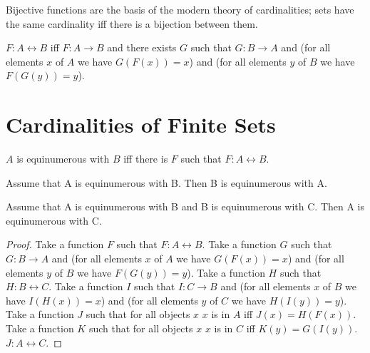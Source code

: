 \documentclass{article}
\begin{document}
Bijective functions are the basis of the modern theory of cardinalities; sets
have the same cardinality iff there is a bijection between them.

\begin{forthel}
    \begin{definition}
        $F : A \leftrightarrow B$ iff $F : A \to B$ and there exists $G$ such that
        $G : B \to A$ and
        (for all elements $x$ of $A$ we have $G(F(x)) = x$) and
        (for all elements $y$ of $B$ we have $F(G(y)) = y$).
    \end{definition}
\end{forthel}


\section{Cardinalities of Finite Sets}

\begin{forthel}
    \begin{definition}
        $A$ is equinumerous with $B$ iff there is $F$ such that $F : A \leftrightarrow B$.
    \end{definition}

    \begin{lemma}
        Assume that A is equinumerous with B. Then B is equinumerous with A.
    \end{lemma}

    \begin{lemma}
        Assume that A is equinumerous with B and B is equinumerous with C.
        Then A is equinumerous with C.
    \end{lemma}
    \begin{proof}
        Take a function $F$ such that $F : A \leftrightarrow B$.
        Take a function $G$ such that $G : B \to A$ and (for all elements $x$ of $A$ we have $G(F(x)) = x$) and
        (for all elements $y$ of $B$ we have $F(G(y))=y$).
        Take a function $H$ such that $H : B \leftrightarrow C$.
        Take a function $I$ such that $I : C \to B$ and (for all elements $x$ of $B$ we have $I(H(x)) = x$) and
        (for all elements $y$ of $C$ we have $H(I(y))=y$).
        Take a function $J$ such that for all objects $x$ $x$ is in $A$ iff $J(x) = H(F(x))$.
        Take a function $K$ such that for all objects $x$ $x$ is in $C$ iff $K(y) = G(I(y))$.
        $J : A \leftrightarrow C$. 
    \end{proof}
\end{forthel}
\end{document}
